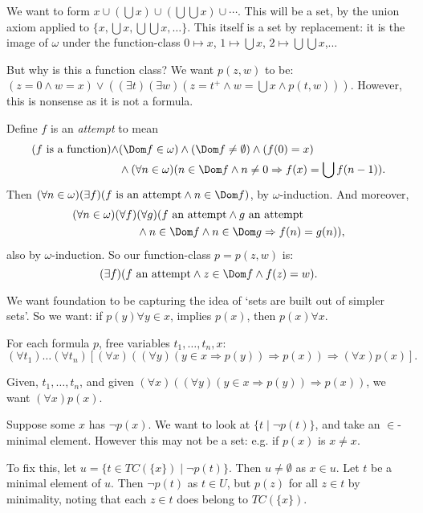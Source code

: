 \documentclass[12pt]{article}
\begin{document}
\begin{proofbox}
	We want to form $x \cup (\bigcup x) \cup (\bigcup \bigcup x) \cup \cdots$. This will be a set, by the union axiom applied to $\{x, \bigcup x, \bigcup \bigcup x, \ldots\}$. This itself is a set by replacement: it is the image of $\omega$ under the function-class $0 \mapsto x$, $1 \mapsto \bigcup x$, $2 \mapsto \bigcup\bigcup x$,...

	But why is this a function class? We want $p(z, w)$ to be: $(z = 0 \wedge w = x) \vee ((\exists t)(\exists w)(z = t^{+} \wedge w = \bigcup x \wedge p(t, w)))$. However, this is nonsense as it is not a formula.

	Define $f$ is an \emph{attempt} to mean
	\begin{align*}
		(f \text{ is a function}) \wedge &(\Dom f \in \omega) \wedge (\Dom f \neq \emptyset) \wedge (f(0) = x) \\
						 &\wedge (\forall n \in \omega)(n \in \Dom f \wedge n \neq 0 \Rightarrow f(x) = \bigcup f(n-1)).
	\end{align*}
	Then $(\forall n \in \omega)(\exists f)(f \text{ is an attempt} \wedge n \in \Dom f)$, by $\omega$-induction. And moreover,
	\begin{align*}
		(\forall n \in \omega)(\forall f)&(\forall g)(f \text{ an attempt} \wedge g \text{ an attempt} \\
						 &\wedge n \in \Dom f \wedge n \in \Dom g \Rightarrow f(n) = g(n)),
	\end{align*}
	also by $\omega$-induction. So our function-class $p = p(z, w)$ is:
	\[
		(\exists f)(f \text{ an attempt} \wedge z \in \Dom f \wedge f(z) = w).
	\]
\end{proofbox}

We want foundation to be capturing the idea of `sets are built out of simpler sets'. So we want: if $p(y) \forall y \in x$, implies $p(x)$, then $p(x) \forall x$.

\begin{theorem}
	For each formula $p$, free variables $t_1, \ldots, t_n, x$:
	\[
		(\forall t_1) \ldots (\forall t_n) [(\forall x)((\forall y)(y \in x \Rightarrow p(y)) \Rightarrow p(x)) \Rightarrow (\forall x)p(x)].
	\]
\end{theorem}

\begin{proofbox}
	Given, $t_1, \ldots, t_n$, and given $(\forall x)((\forall y)(y \in x \Rightarrow p(y)) \Rightarrow p(x))$, we want $(\forall x)p(x)$.

	Suppose some $x$ has $\neg p(x)$. We want to look at $\{t \mid \neg p(t)\}$, and take an $\in$-minimal element. However this may not be a set: e.g. if $p(x)$ is $x \neq x$.

	To fix this, let $u = \{t \in TC(\{x\}) \mid \neg p(t)\}$. Then $u \neq \emptyset$ as $x \in u$. Let $t$ be a minimal element of $u$. Then $\neg p(t)$ as $t \in U$, but $p(z)$ for all $z \in t$ by minimality, noting that each $z \in t$ does belong to $TC(\{x\})$.
\end{proofbox}
\end{document}
